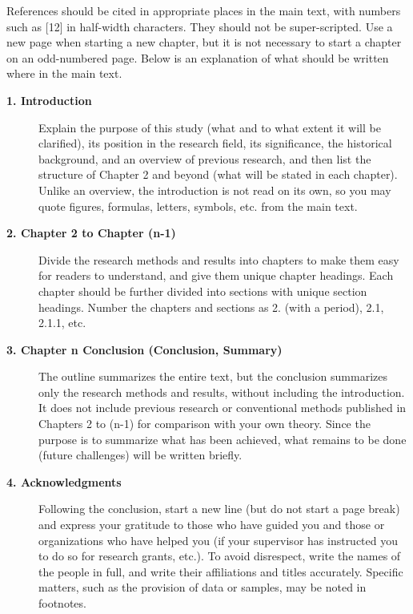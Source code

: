 References should be cited in appropriate places in the main text, with numbers such as [12] in half-width characters. They should not be super-scripted. Use a new page when starting a new chapter, but it is not necessary to start a chapter on an odd-numbered page. Below is an explanation of what should be written where in the main text.

\begin{description}
\item[{\bfseries 1. Introduction} \\]
Explain the purpose of this study (what and to what extent it will be clarified), its position in the research field, its significance, the historical background, and an overview of previous research, and then list the structure of Chapter 2 and beyond (what will be stated in each chapter). Unlike an overview, the introduction is not read on its own, so you may quote figures, formulas, letters, symbols, etc. from the main text.

\item[{\bfseries 2. Chapter 2 to Chapter (n-1)}]
Divide the research methods and results into chapters to make them easy for readers to understand, and give them unique chapter headings. Each chapter should be further divided into sections with unique section headings. Number the chapters and sections as 2. (with a period), 2.1, 2.1.1, etc.

\item[{\bfseries 3. Chapter n Conclusion (Conclusion, Summary)}]
The outline summarizes the entire text, but the conclusion summarizes only the research methods and results, without including the introduction. It does not include previous research or conventional methods published in Chapters 2 to (n-1) for comparison with your own theory. Since the purpose is to summarize what has been achieved, what remains to be done (future challenges) will be written briefly.

\item[{\bfseries 4. Acknowledgments}]
Following the conclusion, start a new line (but do not start a page break) and express your gratitude to those who have guided you and those or organizations who have helped you (if your supervisor has instructed you to do so for research grants, etc.). To avoid disrespect, write the names of the people in full, and write their affiliations and titles accurately. Specific matters, such as the provision of data or samples, may be noted in footnotes.


\end{description}

